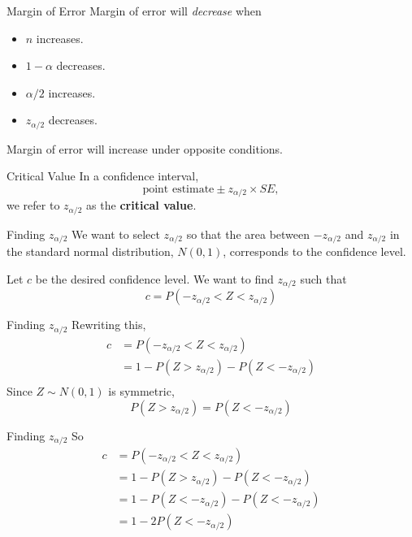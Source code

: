 \begin{frame}{Margin of Error}
    Margin of error will \textit{decrease} when
    \begin{itemize}
        \item $n$ increases.
        \item $1-\alpha$ decreases.
        \item $\alpha/2$ increases.
        \item $z_{\alpha/2}$ decreases.
    \end{itemize}
    Margin of error will increase under opposite conditions.
\end{frame}

\begin{frame}{Critical Value}
    In a confidence interval, 
    \[
        \text{point estimate} \pm z_{\alpha/2} \times SE,
    \]
    we refer to $z_{\alpha/2}$ as the \textbf{critical value}.
\end{frame}

\begin{frame}{Finding $z_{\alpha/2}$}
    We want to select $z_{\alpha/2}$ so that the area between $-z_{\alpha/2}$ and $z_{\alpha/2}$ in the standard normal distribution, $N(0,1)$, corresponds to the confidence level.
    
    \vspace{12pt}Let $c$ be the desired confidence level. We want to find $z_{\alpha/2}$ such that
    \[
        c = P(-z_{\alpha/2} < Z < z_{\alpha/2})
    \]
\end{frame}

\begin{frame}{Finding $z_{\alpha/2}$}
    Rewriting this,
    \begin{align*}
        c &= P(-z_{\alpha/2} < Z < z_{\alpha/2}) \\
        &= 1 - P(Z > z_{\alpha/2}) - P(Z < -z_{\alpha/2}) \\
    \end{align*}
    Since $Z \sim N(0,1)$ is symmetric,
    \[
        P(Z > z_{\alpha/2}) = P(Z < -z_{\alpha/2})
    \]
\end{frame}

\begin{frame}{Finding $z_{\alpha/2}$}
    So
    \begin{align*}
        c &= P(-z_{\alpha/2} < Z < z_{\alpha/2}) \\
        &= 1 - P(Z > z_{\alpha/2}) - P(Z < -z_{\alpha/2}) \\
        &= 1 - P(Z < -z_{\alpha/2}) - P(Z < -z_{\alpha/2}) \\
        &= 1 - 2P(Z < -z_{\alpha/2}) \\
    \end{align*}
\end{frame}

